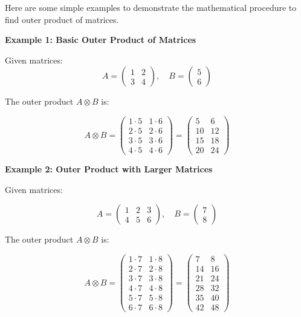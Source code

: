 \documentclass[
  letterpaper,
  DIV=11,
  numbers=noendperiod]{scrreprt}
\theoremstyle{plain}
\theoremstyle{definition}
\theoremstyle{remark}
\begin{document}
Here are some simple examples to demonstrate the mathematical procedure
to find outer product of matrices.

\textbf{Example 1: Basic Outer Product of Matrices}

Given matrices:
\[A = \begin{pmatrix}1 & 2 \\3 & 4\end{pmatrix}, \quad B = \begin{pmatrix}5 \\6\end{pmatrix}\]

The outer product \(A \otimes B\) is:

\[A \otimes B = \begin{pmatrix}1 \cdot 5 & 1 \cdot 6 \\2 \cdot 5 & 2 \cdot 6 \\3 \cdot 5 & 3 \cdot 6 \\4 \cdot 5 & 4 \cdot 6\end{pmatrix} = \begin{pmatrix}5 & 6 \\10 & 12 \\15 & 18 \\20 & 24\end{pmatrix}\]

\textbf{Example 2: Outer Product with Larger Matrices}

Given matrices:

\[A = \begin{pmatrix}1 & 2 & 3 \\4 & 5 & 6\end{pmatrix}, \quad B = \begin{pmatrix}7 \\8\end{pmatrix}\]

The outer product \(A \otimes B\) is:

\[A \otimes B = \begin{pmatrix}1 \cdot 7 & 1 \cdot 8 \\2 \cdot 7 & 2 \cdot 8 \\3 \cdot 7 & 3 \cdot 8 \\4 \cdot 7 & 4 \cdot 8 \\5 \cdot 7 & 5 \cdot 8 \\6 \cdot 7 & 6 \cdot 8\end{pmatrix} = \begin{pmatrix}7 & 8 \\14 & 16 \\21 & 24 \\28 & 32 \\35 & 40 \\42 & 48\end{pmatrix}\]
\end{document}
